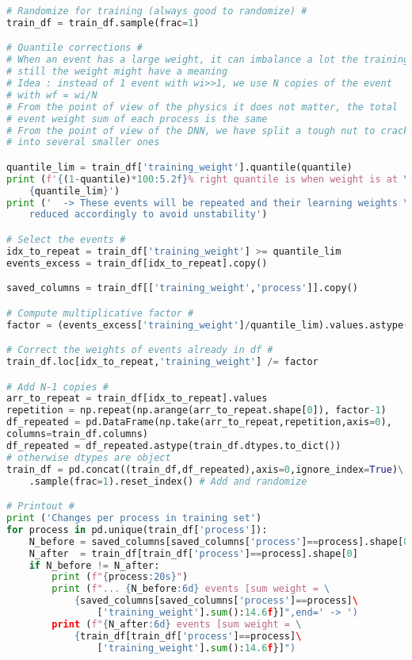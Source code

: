 \begin{lstlisting}[language=Python, caption=Python module of the analysis used in Bamboo framework, label={dnncode}]
# Randomize for training (always good to randomize) #
train_df = train_df.sample(frac=1)

# Quantile corrections #
# When an event has a large weight, it can imbalance a lot the training,
# still the weight might have a meaning
# Idea : instead of 1 event with wi>>1, we use N copies of the event
# with wf = wi/N
# From the point of view of the physics it does not matter, the total
# event weight sum of each process is the same
# From the point of view of the DNN, we have split a tough nut to crack
# into several smaller ones

quantile_lim = train_df['training_weight'].quantile(quantile)
print (f'{(1-quantile)*100:5.2f}% right quantile is when weight is at \
    {quantile_lim}')
print ('  -> These events will be repeated and their learning weights \
    reduced accordingly to avoid unstability') 

# Select the events #
idx_to_repeat = train_df['training_weight'] >= quantile_lim                          
events_excess = train_df[idx_to_repeat].copy()

saved_columns = train_df[['training_weight','process']].copy()

# Compute multiplicative factor #
factor = (events_excess['training_weight']/quantile_lim).values.astype(np.int32) 

# Correct the weights of events already in df #
train_df.loc[idx_to_repeat,'training_weight'] /= factor

# Add N-1 copies #
arr_to_repeat = train_df[idx_to_repeat].values                                       
repetition = np.repeat(np.arange(arr_to_repeat.shape[0]), factor-1)                   
df_repeated = pd.DataFrame(np.take(arr_to_repeat,repetition,axis=0),
columns=train_df.columns)
df_repeated = df_repeated.astype(train_df.dtypes.to_dict()) 
# otherwise dtypes are object
train_df = pd.concat((train_df,df_repeated),axis=0,ignore_index=True)\
    .sample(frac=1).reset_index() # Add and randomize

# Printout #
print ('Changes per process in training set')
for process in pd.unique(train_df['process']):
    N_before = saved_columns[saved_columns['process']==process].shape[0]
    N_after  = train_df[train_df['process']==process].shape[0]
    if N_before != N_after:
        print (f"{process:20s}")
        print (f"... {N_before:6d} events [sum weight = \
            {saved_columns[saved_columns['process']==process]\
                ['training_weight'].sum():14.6f}]",end=' -> ')
        print (f"{N_after:6d} events [sum weight = \
            {train_df[train_df['process']==process]\
                ['training_weight'].sum():14.6f}]")
    

\end{lstlisting}

